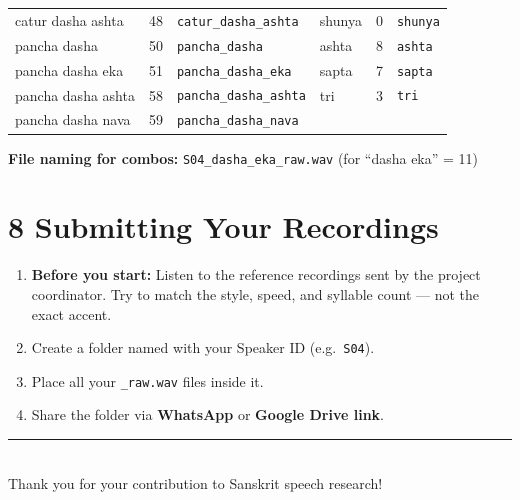 \documentclass[11pt,a4paper]{article}
\begin{document}
\begin{center}
\begin{tabular}{lll|lll}
catur dasha ashta      & 48 & \texttt{catur\_dasha\_ashta}& shunya           &  0 & \texttt{shunya} \\
pancha dasha           & 50 & \texttt{pancha\_dasha}    & ashta              &  8 & \texttt{ashta} \\
pancha dasha eka       & 51 & \texttt{pancha\_dasha\_eka}& sapta             &  7 & \texttt{sapta} \\
pancha dasha ashta     & 58 & \texttt{pancha\_dasha\_ashta}& tri              &  3 & \texttt{tri} \\
pancha dasha nava      & 59 & \texttt{pancha\_dasha\_nava}& &  & \\
\bottomrule
\end{tabular}
\end{center}

\vspace{0.3cm}
\noindent
\textbf{File naming for combos:}
\texttt{S04\_dasha\_eka\_raw.wav} (for ``dasha eka'' = 11)

\section*{8 \quad Submitting Your Recordings}

\begin{enumerate}[leftmargin=1.5em, itemsep=4pt]
  \item \textbf{Before you start:} Listen to the reference recordings sent by
        the project coordinator. Try to match the style, speed, and syllable
        count --- not the exact accent.
  \item Create a folder named with your Speaker ID (e.g.\ \texttt{S04}).
  \item Place all your \texttt{\_raw.wav} files inside it.
  \item Share the folder via \textbf{WhatsApp} or \textbf{Google Drive link}.
\end{enumerate}

\vspace{0.5cm}
\begin{center}
  {\color{saffron}\rule{0.6\textwidth}{1pt}}\\[0.3cm]
  {\small\color{gray} Thank you for your contribution to Sanskrit speech research!}
\end{center}
\end{document}
